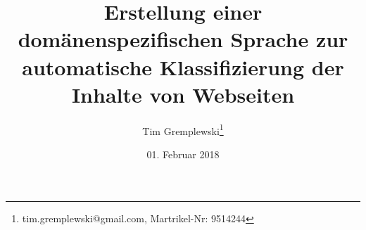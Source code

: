 \documentclass[titlepage,twoside,openright]{scrreprt}
\title{Erstellung einer domänenspezifischen Sprache zur automatische Klassifizierung der Inhalte von Webseiten}
\author{Tim Gremplewski\thanks{tim.gremplewski@gmail.com, Martrikel-Nr: 9514244}}
\date{01. Februar 2018}
\begin{document}
	\maketitle
	\begingroup
		\let\cleardoublepage\relax
		\let\clearpage\relax
		\tableofcontents
		\listoffigures
		\lstlistoflistings
	\endgroup

	\newpage

	\cite{voelter:DslEngineering}

	\sloppy
	\printbibliography[heading=bibintoc]
\end{document}
